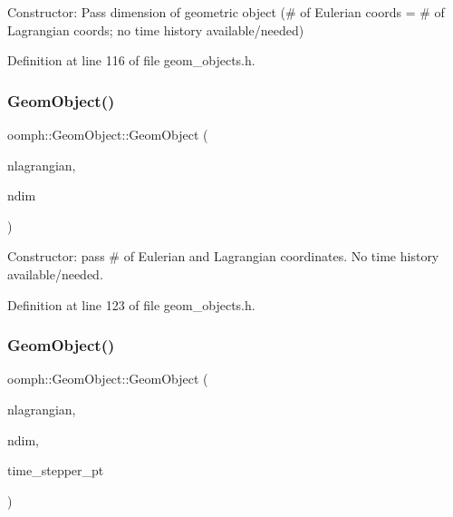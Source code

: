 Constructor\+: Pass dimension of geometric object (\# of Eulerian coords = \# of Lagrangian coords; no time history available/needed) 



Definition at line 116 of file geom\+\_\+objects.\+h.

\mbox{\label{classoomph_1_1GeomObject_ae3fcf14b1bf5d2bc26f64156baecb7da}} 
\subsubsection{\texorpdfstring{Geom\+Object()}{GeomObject()}\hspace{0.1cm}{\footnotesize\ttfamily [3/5]}}
{\footnotesize\ttfamily oomph\+::\+Geom\+Object\+::\+Geom\+Object (\begin{DoxyParamCaption}\item[{const unsigned \&}]{nlagrangian,  }\item[{const unsigned \&}]{ndim }\end{DoxyParamCaption})\hspace{0.3cm}{\ttfamily [inline]}}



Constructor\+: pass \# of Eulerian and Lagrangian coordinates. No time history available/needed. 



Definition at line 123 of file geom\+\_\+objects.\+h.

\mbox{\label{classoomph_1_1GeomObject_a75a091c285c27b4efc14c5afed4d3b31}} 
\subsubsection{\texorpdfstring{Geom\+Object()}{GeomObject()}\hspace{0.1cm}{\footnotesize\ttfamily [4/5]}}
{\footnotesize\ttfamily oomph\+::\+Geom\+Object\+::\+Geom\+Object (\begin{DoxyParamCaption}\item[{const unsigned \&}]{nlagrangian,  }\item[{const unsigned \&}]{ndim,  }\item[{\hyperlink{classoomph_1_1TimeStepper}{Time\+Stepper} $\ast$}]{time\+\_\+stepper\+\_\+pt }\end{DoxyParamCaption})\hspace{0.3cm}{\ttfamily [inline]}}




